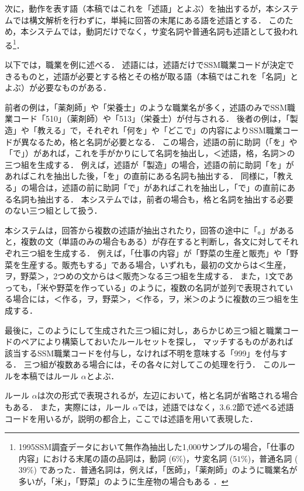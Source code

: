 \documentclass[japanese]{jnlp_1.4}
\begin{document}
次に，動作を表す語（本稿ではこれを「述語」とよぶ）を抽出するが，本システムでは構文解析を行わずに，単純に回答の末尾にある語を述語とする．
このため，本システムでは，動詞だけでなく，サ変名詞や普通名詞も述語として扱われる\footnote{1995SSM調査データにおいて無作為抽出した1,000サンプルの場合，「仕事の内容」における末尾の語の品詞は，動詞 ($6\%$)，サ変名詞 ($51\%$)，普通名詞 ($39\%$) であった．普通名詞は，例えば，「医師」，「薬剤師」のように職業名が多いが，「米」，「野菜」のように生産物の場合もある \cite{Takahashi00}．}． 

以下では，職業を例に述べる．
述語には，述語だけでSSM職業コードが決定できるものと，述語が必要とする格とその格が取る語（本稿ではこれを「名詞」とよぶ）が必要なものがある．

前者の例は，「薬剤師」や「栄養士」のような職業名が多く，述語のみでSSM職業コード「510」（薬剤師）や「513」（栄養士）が付与される．
後者の例は，「製造」や「教える」で，それぞれ「何を」や「どこで」の内容によりSSM職業コードが異なるため，格と名詞が必要となる． 
この場合，述語の前に助詞（「を」や「で」）があれば，これを手がかりにして名詞を抽出し，＜述語，格，名詞＞の三つ組を生成する． 
例えば，述語が「製造」の場合，述語の前に助詞「を」があればこれを抽出した後，「を」の直前にある名詞も抽出する．
同様に，「教える」の場合は，述語の前に助詞「で」があればこれを抽出し，「で」の直前にある名詞も抽出する．
本システムでは，前者の場合も，格と名詞を抽出する必要のない三つ組として扱う．

本システムは，回答から複数の述語が抽出されたり，回答の途中に「。」があると，複数の文（単語のみの場合もある）が存在すると判断し，各文に対してそれぞれ三つ組を生成する． 
例えば，「仕事の内容」が「野菜の生産と販売」や「野菜を生産する。販売もする」である場合，いずれも，最初の文からは＜生産，ヲ，野菜＞，2つめの文からは＜販売＞なる三つ組を生成する．
また，1文であっても，「米や野菜を作っている」のように，複数の名詞が並列で表現されている場合には，＜作る，ヲ，野菜＞，＜作る，ヲ，米＞のように複数の三つ組を生成する．

最後に，このようにして生成された三つ組に対し，あらかじめ三つ組と職業コードのペアにより構築しておいたルールセットを探し， マッチするものがあれば該当するSSM職業コードを付与し，なければ不明を意味する「999」を付与する．
三つ組が複数ある場合には，その各々に対してこの処理を行う．
このルールを本稿ではルール $\alpha$とよぶ．

ルール $\alpha$は次の形式で表現されるが，左辺において，格と名詞が省略される場合もある．
また，実際には，ルール $\alpha$では，述語ではなく，3.6.2節で述べる述語コードを用いるが，説明の都合上，ここでは述語を用いて表現した．
\end{document}
